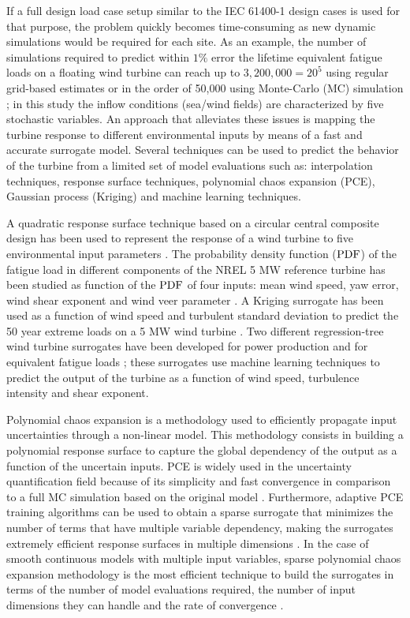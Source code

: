 \documentclass[preprint,12pt]{elsarticle}
\begin{document}
If a full design load case setup similar to the IEC 61400-1 design cases is used for that purpose, the problem quickly becomes time-consuming as new dynamic simulations would be required for each site. As an example, the number of simulations required to predict within $1\%$ error the lifetime equivalent fatigue loads on a floating wind turbine can reach up to $3,200,000=20^5$ using regular grid-based estimates or in the order of 50,000 using Monte-Carlo (MC) simulation \cite{graf2015high}; in this study the inflow conditions (sea/wind fields) are characterized by five stochastic variables. An approach that alleviates these issues is mapping the turbine response to different environmental inputs by means of a fast and accurate surrogate model. Several techniques can be used to predict the behavior of the turbine from a limited set of model evaluations such as: interpolation techniques, response surface techniques, polynomial chaos expansion (PCE), Gaussian process (Kriging) and machine learning techniques. 

A quadratic response surface technique based on a circular central composite design has been used to represent the response of a wind turbine to five environmental input parameters \cite{toft2016assessment}. The probability density function ($\mathrm{PDF}$) of the fatigue load in different components of the NREL 5 MW reference turbine has been studied as function of the $\mathrm{PDF}$ of four inputs: mean wind speed, yaw error, wind shear exponent and wind veer parameter \cite{TallwindReport}. A Kriging surrogate has been used as a function of wind speed and turbulent standard deviation to predict the 50 year extreme loads on a 5 MW wind turbine \cite{abdallah2016influence}. Two different regression-tree wind turbine surrogates have been developed for power production \cite{clifton2013using} and for equivalent fatigue loads \cite{clifton2014effect}; these surrogates use machine learning techniques to predict the output of the turbine as a function of wind speed, turbulence intensity and shear exponent.

Polynomial chaos expansion is a methodology used to efficiently propagate input uncertainties through a non-linear model. This methodology consists in building a polynomial response surface to capture the global dependency of the output as a function of the uncertain inputs. PCE is widely used in the uncertainty quantification field because of its simplicity and fast convergence in comparison to a full MC simulation based on the original model \cite{soize2004physical, le2004uncertainty, choi2004polynomial, berveiller2006stochastic, xiu2005high}. Furthermore, adaptive PCE training algorithms can be used to obtain a sparse surrogate that minimizes the number of terms that have multiple variable dependency, making the surrogates extremely efficient response surfaces in multiple dimensions  \cite{blatman2011adaptive,pedregosa2011scikit,tibshirani1996regression}. In the case of smooth continuous models with multiple input variables, sparse polynomial chaos expansion methodology is the most efficient technique to build the surrogates in terms of the number of model evaluations required, the number of input dimensions they can handle and the rate of convergence \cite{blatman2011adaptive}.
\end{document}

